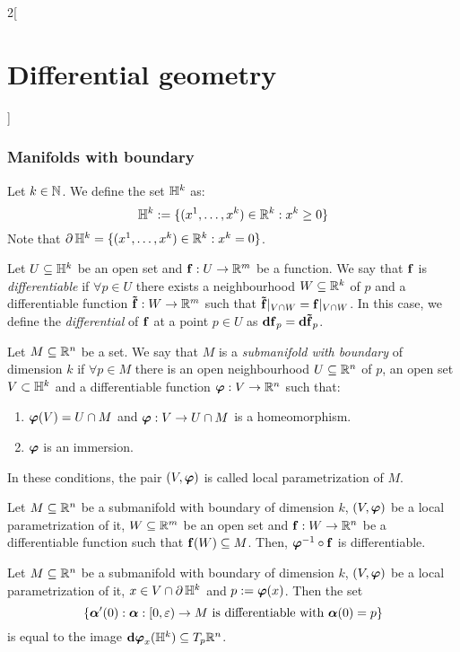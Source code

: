 \documentclass[../../../main_math.tex]{subfiles}
\begin{document}
\begin{multicols}{2}[\section{Differential geometry}]
  \subsubsection{Manifolds with boundary}
  \begin{definition}
    Let $k\in\mathbb{N}$. We define the set $\mathbb{H}^k$ as: $$\mathbb{H}^k:=\{(x^1,\ldots,x^k)\in\mathbb{R}^k:x^k\geq 0\}$$
    Note that $\operatorname{\partial}{\mathbb{H}^k}=\{(x^1,\ldots,x^k)\in\mathbb{R}^k:x^k=0\}$.
  \end{definition}
  \begin{definition}
    Let $U\subseteq \mathbb{H}^k$ be an open set and $\boldsymbol{\mathrm{f}}:U\rightarrow\mathbb{R}^m$ be a function. We say that $\boldsymbol{\mathrm{f}}$ is \emph{differentiable} if $\forall p\in U$ there exists a neighbourhood $W\subseteq \mathbb{R}^k$ of $p$ and a differentiable function $\boldsymbol{\mathrm{\tilde{f}}}:W\rightarrow\mathbb{R}^m$ such that $\boldsymbol{\mathrm{\tilde{f}}}|_{V\cap W}=\boldsymbol{\mathrm{f}}|_{V\cap W}$. In this case, we define the \emph{differential} of $\boldsymbol{\mathrm{f}}$ at a point $p\in U$ as $\boldsymbol{\mathrm{df}}_p=\boldsymbol{\mathrm{d\tilde{f}}}_p$.
  \end{definition}
  \begin{definition}
    Let $M\subseteq\mathbb{R}^n$ be a set. We say that $M$ is a \emph{submanifold with boundary} of dimension $k$ if $\forall p\in M$ there is an open neighbourhood $U\subseteq\mathbb{R}^n$ of $p$, an open set $V\subset \mathbb{H}^k$ and a differentiable function $\boldsymbol{\mathrm{\varphi}}:V\rightarrow\mathbb{R}^n$ such that:
    \begin{enumerate}
      \item $\boldsymbol{\mathrm{\varphi}}(V)=U\cap M$ and $\boldsymbol{\mathrm{\varphi}}:V\rightarrow U\cap M$ is a homeomorphism.
      \item $\boldsymbol{\mathrm{\varphi}}$ is an immersion.
    \end{enumerate}
    In these conditions, the pair $(V,\boldsymbol{\mathrm{\varphi}})$ is called local parametrization of $M$.
  \end{definition}
  \begin{proposition}
    Let $M\subseteq\mathbb{R}^n$ be a submanifold with boundary of dimension $k$, $(V,\boldsymbol{\mathrm{\varphi}})$ be a local parametrization of it, $W\subseteq \mathbb{R}^m$ be an open set and $\boldsymbol{\mathrm{f}}:W\rightarrow\mathbb{R}^n$ be a differentiable function such that $\boldsymbol{\mathrm{f}}(W)\subseteq M$. Then, ${\boldsymbol{\mathrm{\varphi}}}^{-1}\circ\boldsymbol{\mathrm{f}}$ is differentiable.
  \end{proposition}
  \begin{lemma}
    Let $M\subseteq\mathbb{R}^n$ be a submanifold with boundary of dimension $k$, $(V,\boldsymbol{\mathrm{\varphi}})$ be a local parametrization of it, $x\in V\cap \operatorname{\partial}{\mathbb{H}^k}$ and $p:=\boldsymbol{\mathrm{\varphi}}(x)$. Then the set $$\{\boldsymbol{\mathrm{\alpha}}'(0):\boldsymbol{\mathrm{\alpha}}:[0,\varepsilon)\rightarrow M\text{ is differentiable with }\boldsymbol{\mathrm{\alpha}}(0)=p\}$$ is equal to the image $\boldsymbol{\mathrm{\dd}}\boldsymbol{\mathrm{\varphi}}_x(\mathbb{H}^k)\subseteq T_p\mathbb{R}^n$.

\end{lemma}
\end{multicols}
\end{document}
